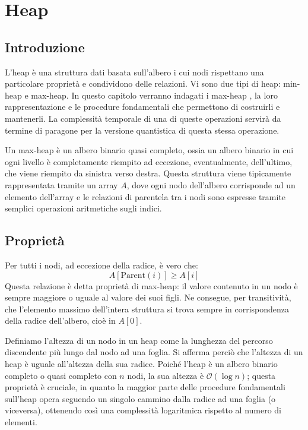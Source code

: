 \chapter{Heap \label{ch:heap}}
\section{Introduzione}
L'heap è una struttura dati basata sull'albero i cui nodi rispettano una particolare proprietà e condividono delle relazioni. Vi sono due tipi di heap: min-heap e max-heap. In questo capitolo verranno indagati i max-heap \cite{cormen2022introduction}, la loro rappresentazione e le procedure fondamentali che permettono di costruirli e mantenerli. La complessità temporale di una di queste operazioni servirà da termine di paragone per la versione quantistica di questa stessa operazione.

Un max-heap è un albero binario quasi completo, ossia un albero binario in cui ogni livello è completamente riempito ad eccezione, eventualmente, dell'ultimo, che viene riempito da sinistra verso destra. Questa struttura viene tipicamente rappresentata tramite un array $A$, dove ogni nodo dell'albero corrisponde ad un elemento dell'array e le relazioni di parentela tra i nodi sono espresse tramite semplici operazioni aritmetiche sugli indici.

\section{Proprietà \label{sec:proprieta}}
Per tutti i nodi, ad eccezione della radice, è vero che:
\begin{equation}
  A[\text{Parent}(i)] \geq A[i]
\end{equation}
Questa relazione è detta proprietà di max-heap: il valore contenuto in un nodo è sempre maggiore o uguale al valore dei suoi figli. Ne consegue, per transitività, che l'elemento massimo dell'intera struttura si trova sempre in corrispondenza della radice dell'albero, cioè in $A[0]$.

Definiamo l'altezza di un nodo in un heap come la lunghezza del percorso discendente più lungo dal nodo ad una foglia. Si afferma perciò che l'altezza di un heap è uguale all'altezza della sua radice. Poiché l'heap è un albero binario completo o quasi completo con $n$ nodi, la sua altezza è $\mathcal{O}(\log n)$; questa proprietà è cruciale, in quanto la maggior parte delle procedure fondamentali sull'heap opera seguendo un singolo cammino dalla radice ad una foglia (o viceversa), ottenendo così una complessità logaritmica rispetto al numero di elementi.

